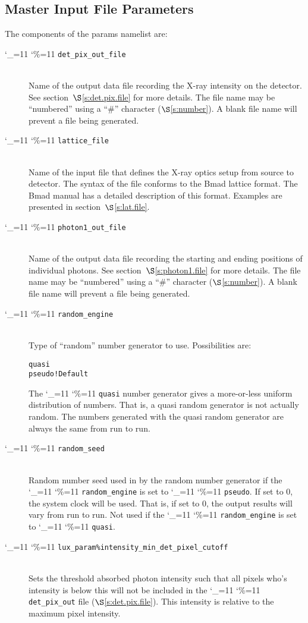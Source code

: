 \documentclass[11pt]{article}
\newcommand\ttcmd{\begingroup\catcode`\_=11 \catcode`\%=11 \dottcmd}
\newcommand\dottcmd[1]{\texttt{#1}\endgroup}
\newcommand{\vn}{\ttcmd}
\newcommand{\Newline}{\hfil \\}
\newcommand{\sref}[1]{$\S$\ref{#1}}
\newenvironment{example}
  {\vspace{\ExBeg} \begin{alltt}}
  {\end{alltt} \vspace{\ExEnd}}
\newlength{\ExBeg}
\newlength{\ExEnd}
\begin{document}
\subsection{Master Input File Parameters}
\label{ss:master.params}

The components of the params namelist are:
  \begin{description}
  \item[\vn{det_pix_out_file}] \Newline
Name of the output data file recording the X-ray intensity on the
detector. See section~\sref{s:det.pix.file} for more details. The file
name may be ``numbered'' using a ``\#'' character (\sref{s:number}). A
blank file name will prevent a file being generated.

  \item[\vn{lattice_file}] \Newline
Name of the input file that defines the X-ray optics setup from source
to detector. The syntax of the file conforms to the Bmad lattice
format. The Bmad manual has a detailed description of this format.
Examples are presented in section~\sref{s:lat.file}.

  \item[\vn{photon1_out_file}] \Newline
Name of the output data file recording the starting and ending
positions of individual photons. See section~\sref{s:photon1.file} for
more details. The file name may be ``numbered'' using 
a ``\#'' character (\sref{s:number}). A blank file name will prevent a
file being generated.

  \item[\vn{random_engine}] \Newline
Type of ``random'' number generator to use. Possibilities are:
\begin{example}
  quasi      
  pseudo      ! Default
\end{example}
The \vn{quasi} number generator gives a more-or-less uniform
distribution of numbers. That is, a quasi random generator is not
actually random. The numbers generated with the quasi random generator
are always the same from run to run.

  \item[\vn{random_seed}] \Newline
Random number seed used in by the random number generator if the
\vn{random_engine} is set to \vn{pseudo}. If set to 0, the system
clock will be used. That is, if set to 0, the output results will vary
from run to run. Not used if the \vn{random_engine} is set to \vn{quasi}.

  \item[\vn{lux_param\%intensity_min_det_pixel_cutoff}] \Newline
Sets the threshold absorbed photon intensity such that all pixels
who's intensity is below this will not be included in the
\vn{det_pix_out} file (\sref{s:det.pix.file}). This intensity is
relative to the maximum pixel intensity. 


\end{description}
\end{document}
